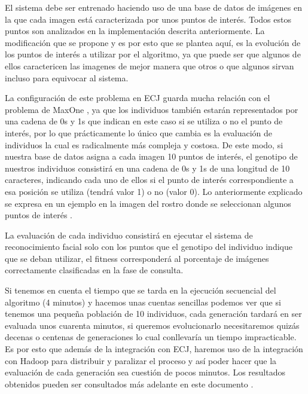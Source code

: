 El sistema debe ser entrenado haciendo uso de una base de datos de imágenes en la que cada imagen est\'a caracterizada por unos puntos de interés. Todos estos puntos son analizados en la implementación descrita anteriormente. La modificación que se propone y es por esto que se plantea aquí, es la evolución de los puntos de interés a utilizar por el algoritmo, ya que puede ser que algunos de ellos caractericen las imagenes de mejor manera que otros o que algunos sirvan incluso para equivocar al sistema.

La configuraci\'on de este problema en ECJ guarda mucha relación con el problema de MaxOne , ya que los individuos también estar\'an representados por una cadena de 0s y 1s que indican en este caso si se utiliza o no el punto de interés, por lo que prácticamente lo único que cambia es la evaluación de individuos la cual es radicalmente m\'as compleja y costosa. De este modo, si nuestra base de datos asigna a cada imagen 10 puntos de inter\'es, el genotipo de nuestros individuos consistir\'a en una cadena de 0s y 1s de una longitud de 10 caracteres, indicando cada uno de ellos si el punto de inter\'es correspondiente a esa posición se utiliza (tendr\'a valor 1) o no (valor 0). Lo anteriormente explicado se expresa en un ejemplo en la imagen del rostro donde se seleccionan algunos puntos de interés .


La evaluación de cada individuo consistirá en ejecutar el sistema de reconocimiento facial solo con los puntos que el genotipo del individuo indique que se deban utilizar, el fitness corresponderá al porcentaje de imágenes correctamente clasificadas en la fase de consulta.

Si tenemos en cuenta el tiempo que se tarda en la ejecución secuencial del algoritmo (4 minutos) y hacemos unas cuentas sencillas podemos ver que si tenemos una peque\~na población de 10 individuos, cada generación tardar\'a en ser evaluada unos cuarenta minutos, si queremos evolucionarlo necesitaremos quizás decenas o centenas de generaciones lo cual conllevar\'ia un tiempo impracticable. Es por esto que adem\'as de la integración con ECJ, haremos uso de la integración con Hadoop para distribuir y paralizar el proceso y así poder hacer que la evaluación de cada generación sea cuestión de pocos minutos. Los resultados obtenidos pueden ser consultados m\'as adelante en este documento .

